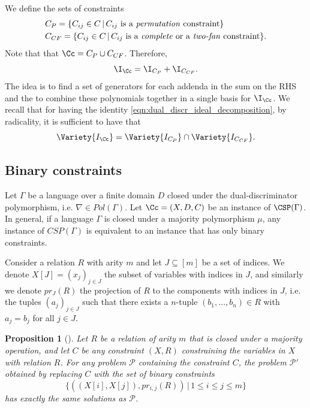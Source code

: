 \documentclass[11pt]{article}
\newtheorem{proposition}[theorem]{Proposition}
\begin{document}
We define the sets of constraints
\begin{align*}
    &C_{P} = \{ C_{ij} \in C \, | \, C_{ij} \text{ is a \textit{permutation} constraint} \} \\
    &C_{CF} = \{ C_{ij} \in C \, | \, C_{ij} \text{ is a \textit{complete} or a \textit{two-fan} constraint} \}.
\end{align*}
Note that that $\Cc = C_{P} \cup C_{CF}$. Therefore,
\begin{equation}\label{eqn:dual_discr_ideal_decomposition}
    \I_{\Cc} = \I_{C_P} + \I_{C_{CF}}.
\end{equation}
The idea is to find a set of generators for each addenda in the sum on the RHS and the to combine these polynomials together in a single \GB basis for $\I_{\Cc}$. We recall that for having the identity \cref{eqn:dual_discr_ideal_decomposition}, by radicality, it is sufficient to have that
\begin{equation*}
    \Variety{I_{\Cc}} = \Variety{I_{C_P}} \cap \Variety{I_{C_{CF}}}.
\end{equation*}

\subsection{Binary constraints}\label{sect:intro_dual_discriminator}

Let $\Gamma$ be a language over a finite domain $D$ closed under the dual-discriminator polymorphism, i.e. $\nabla \in Pol(\Gamma)$. Let $\Cc = (X, D, C)$ be an instance of $\CSP(\Gamma)$. In general, if a language $\Gamma$ is closed under a majority polymorphism $\mu$, any instance of $CSP(\Gamma)$ is equivalent to an instance that has only binary constraints. 

Consider a relation $R$ with arity $m$ and let $J \subseteq [m]$ be a set of indices. We denote $X[J] = (x_j)_{j \in J}$ the subset of variables with indices in $J$, and similarly we denote $pr_J(R)$ the projection of $R$ to the components with indices in $J$, i.e. the tuples $(a_j)_{j \in J}$ such that there exists a $n$-tuple $(b_1, \ldots, b_n) \in R$ with $a_j = b_j$ for all $j \in J$.

\begin{proposition}[\cite{Jeavons:1997:CPC}]\label{prop:majority_to_binary_majority}
    Let $R$ be a relation of arity $m$ that is closed under a majority operation, and let $C$ be any constraint $(X,R)$ constraining the variables in $X$ with relation $R$.
    For any problem $\mathcal{P}$ containing the constraint $C$, the problem $\mathcal{P}'$ obtained by replacing $C$ with the set of binary constraints
    \begin{equation*}
        \{((X[i],X[j]), pr_{i,j}(R)) \, | \, 1 \leq i \leq j \leq m \}
    \end{equation*}
    has exactly the same solutions as $\mathcal{P}$.
\end{proposition}
\end{document}

